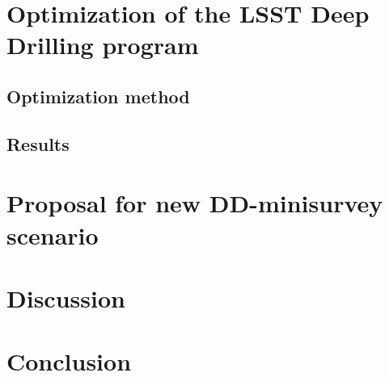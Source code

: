 \documentclass[\docopts]{\docclass}
\begin{document}










\section{Optimization of the LSST Deep Drilling  program}
\label{sec:optimization}
\subsection{Optimization method}


\subsection{Results}



\section{Proposal for new DD-minisurvey scenario}
\label{sec:proposal}


\section{Discussion}
\label{sec:discussion}




\section{Conclusion}
\label{sec:conclusion}



\end{document}
